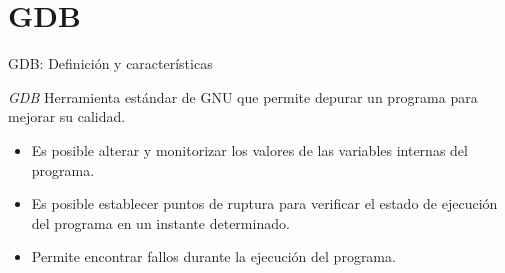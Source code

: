 \documentclass{beamer}
\begin{document}
\section{GDB}

	\begin{frame}{GDB: Definición y características}
		\begin{block}{\textit{GDB}}		
			\justifying Herramienta estándar de GNU que permite depurar un programa para mejorar su calidad.		
		\end{block}		
		
		\begin{itemize}		
			\vfill\item \justifying Es posible alterar y monitorizar los valores de las variables internas del programa. \\
			\vfill\item \justifying Es posible establecer puntos de ruptura para verificar el estado de ejecución del programa en un instante determinado.
			\vfill\item \justifying Permite encontrar fallos durante la ejecución del programa.
		\end{itemize}
	\end{frame}

\usebackgroundtemplate{}
\end{document}
